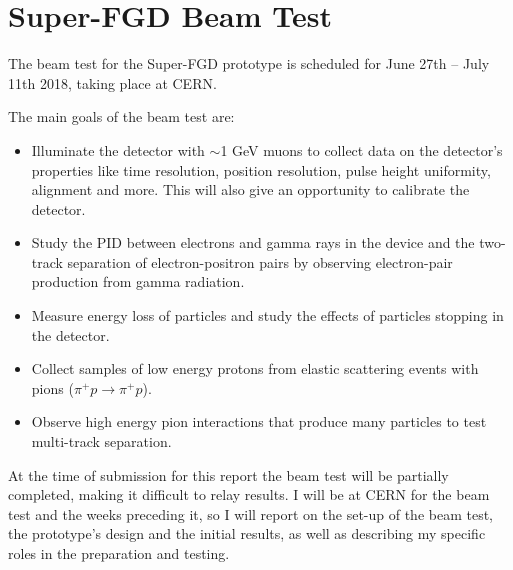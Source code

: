 \documentclass[aps,pra,12pt,notitlepage,tightenlines]{revtex4-1}
\begin{document}
\section{Super-FGD Beam Test}
The beam test for the Super-FGD prototype is scheduled for June 27th -- July 11th 2018, taking place at CERN.

The main goals of the beam test are:
\begin{itemize}
 \item Illuminate the detector with $\sim$1 GeV muons to collect data on the detector's properties like time resolution, position resolution, pulse height uniformity, alignment and more. This will also give an opportunity to calibrate the detector.
 \item Study the PID between electrons and gamma rays in the device and the two-track separation of electron-positron pairs by observing electron-pair production from gamma radiation.
 \item Measure energy loss of particles and study the effects of particles stopping in the detector.
 \item Collect samples of low energy protons from elastic scattering events with pions ($\pi^+ p \rightarrow \pi^+ p$).
 \item Observe high energy pion interactions that produce many particles to test multi-track separation.
\end{itemize}

At the time of submission for this report the beam test will be partially completed, making it difficult to relay results. I will be at CERN for the beam test and the weeks preceding it, so I will report on the set-up of the beam test, the prototype's design and the initial results, as well as describing my specific roles in the preparation and testing.
\end{document}
